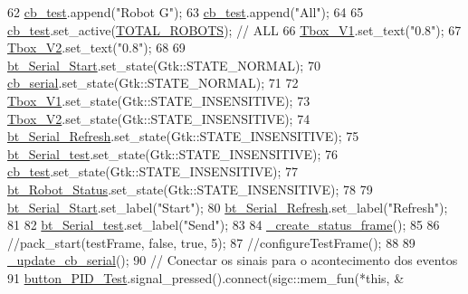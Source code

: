 \begin{DoxyCode}
62     \hyperlink{class_control_g_u_i_a93ab5972cf38d2cf8431cb375abc56e6}{cb\_test}.append(\textcolor{stringliteral}{"Robot G"});
63     \hyperlink{class_control_g_u_i_a93ab5972cf38d2cf8431cb375abc56e6}{cb\_test}.append(\textcolor{stringliteral}{"All"});
64 
65     \hyperlink{class_control_g_u_i_a93ab5972cf38d2cf8431cb375abc56e6}{cb\_test}.set\_active(\hyperlink{class_control_g_u_i_a5a2c1a15c09444b56794705721ba73fa}{TOTAL\_ROBOTS}); \textcolor{comment}{// ALL}
66     \hyperlink{class_control_g_u_i_a8c9b9a41a7ac7de9a7c1c323f70e43b4}{Tbox\_V1}.set\_text(\textcolor{stringliteral}{"0.8"});
67     \hyperlink{class_control_g_u_i_ad4ec00b7d15236b0b8e6723e115c190a}{Tbox\_V2}.set\_text(\textcolor{stringliteral}{"0.8"});
68 
69     \hyperlink{class_control_g_u_i_ae4c22e835b13a173a02ef4514b28c7f1}{bt\_Serial\_Start}.set\_state(Gtk::STATE\_NORMAL);
70     \hyperlink{class_control_g_u_i_a730f792c7de4d8c3cd4c933876d8bc52}{cb\_serial}.set\_state(Gtk::STATE\_NORMAL);
71 
72     \hyperlink{class_control_g_u_i_a8c9b9a41a7ac7de9a7c1c323f70e43b4}{Tbox\_V1}.set\_state(Gtk::STATE\_INSENSITIVE);
73     \hyperlink{class_control_g_u_i_ad4ec00b7d15236b0b8e6723e115c190a}{Tbox\_V2}.set\_state(Gtk::STATE\_INSENSITIVE);
74     \hyperlink{class_control_g_u_i_a391e47311e2e097bf551726b1df5d794}{bt\_Serial\_Refresh}.set\_state(Gtk::STATE\_INSENSITIVE);
75     \hyperlink{class_control_g_u_i_a877559405ad1764d83748016a0f09d94}{bt\_Serial\_test}.set\_state(Gtk::STATE\_INSENSITIVE);
76     \hyperlink{class_control_g_u_i_a93ab5972cf38d2cf8431cb375abc56e6}{cb\_test}.set\_state(Gtk::STATE\_INSENSITIVE);
77     \hyperlink{class_control_g_u_i_aa41e46c34d55d0d4c7b53ed2fa14deb8}{bt\_Robot\_Status}.set\_state(Gtk::STATE\_INSENSITIVE);
78 
79     \hyperlink{class_control_g_u_i_ae4c22e835b13a173a02ef4514b28c7f1}{bt\_Serial\_Start}.set\_label(\textcolor{stringliteral}{"Start"});
80     \hyperlink{class_control_g_u_i_a391e47311e2e097bf551726b1df5d794}{bt\_Serial\_Refresh}.set\_label(\textcolor{stringliteral}{"Refresh"});
81 
82     \hyperlink{class_control_g_u_i_a877559405ad1764d83748016a0f09d94}{bt\_Serial\_test}.set\_label(\textcolor{stringliteral}{"Send"});
83 
84     \hyperlink{class_control_g_u_i_ae1e6b2a93d61568a7bf5cdc5870e1f6c}{\_create\_status\_frame}();
85 
86     \textcolor{comment}{//pack\_start(testFrame, false, true, 5);}
87     \textcolor{comment}{//configureTestFrame();}
88 
89     \hyperlink{class_control_g_u_i_ac1c2a324c056d78dae8e2a0123855dc1}{\_update\_cb\_serial}();
90     \textcolor{comment}{// Conectar os sinais para o acontecimento dos eventos}
91     \hyperlink{class_control_g_u_i_a3e71e5f6e11ffd2ab7a206988ef8d7bb}{button\_PID\_Test}.signal\_pressed().connect(sigc::mem\_fun(*\textcolor{keyword}{this}, &

\end{DoxyCode}
